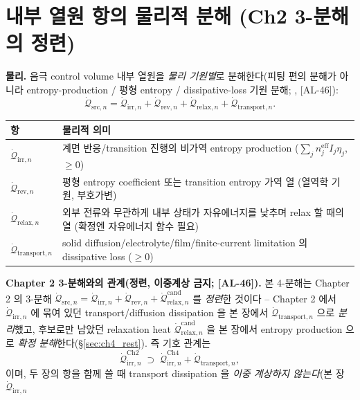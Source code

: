 \documentclass[11pt,a4paper]{article}
\newcommand{\eff}{\mathrm{eff}}
\newcommand{\irr}{\mathrm{irr}}
\newcommand{\rev}{\mathrm{rev}}
\newcommand{\src}{\mathrm{src}}
\newcommand{\rlx}{\mathrm{relax}}
\newcommand{\cand}{\mathrm{cand}}
\newcommand{\transp}{\mathrm{transport}}
\newcommand{\AL}[1]{\textsf{[AL-#1]}}
\begin{document}
\section{내부 열원 항의 물리적 분해 (Ch2 3-분해의 정련)}\label{sec:ch4_decomp}
\textbf{물리.} 음극 control volume 내부 열원을 \emph{물리 기원별}로 분해한다(피팅 편의 분해가 아니라
entropy-production / 평형 entropy / dissipative-loss 기원 분해; \cite{bernardi1985,rao1997,thomasnewman2003}, \AL{46}):
\begin{equation}
\dot{\mathcal Q}_{\src,n}=\dot{\mathcal Q}_{\irr,n}+\dot{\mathcal Q}_{\rev,n}+\dot{\mathcal Q}_{\rlx,n}+\dot{\mathcal Q}_{\transp,n}.
\label{eq:ch4_decomp}
\end{equation}
\begin{longtable}{p{} >{\raggedright\arraybackslash}p{}}
\toprule 항 & 물리적 의미 \\ \midrule \endhead
$\dot{\mathcal Q}_{\irr,n}$ & 계면 반응/transition 진행의 비가역 entropy production ($\sum_j n_j^{\eff}I_j\eta_j$, $\ge0$) \\
$\dot{\mathcal Q}_{\rev,n}$ & 평형 entropy coefficient 또는 transition entropy 가역 열 (열역학 기원, 부호가변) \\
$\dot{\mathcal Q}_{\rlx,n}$ & 외부 전류와 무관하게 내부 상태가 자유에너지를 낮추며 relax 할 때의 열 (확정엔 자유에너지 함수 필요) \\
$\dot{\mathcal Q}_{\transp,n}$ & solid diffusion/electrolyte/film/finite-current limitation 의 dissipative loss ($\ge0$) \\
\bottomrule
\end{longtable}
\textbf{Chapter 2 3-분해와의 관계(정련, 이중계상 금지; \AL{46}).} 본 4-분해는 Chapter 2 의 3-분해
$\dot{\mathcal Q}_{\src,n}=\dot{\mathcal Q}_{\irr,n}+\dot{\mathcal Q}_{\rev,n}+\dot{\mathcal Q}_{\rlx,n}^{\cand}$
를 \emph{정련}한 것이다 -- Chapter 2 에서 $\dot{\mathcal Q}_{\irr,n}$ 에 묶여 있던 transport/diffusion
dissipation 을 본 장에서 $\dot{\mathcal Q}_{\transp,n}$ 으로 \emph{분리}했고, 후보로만 남았던 relaxation heat
$\dot{\mathcal Q}_{\rlx,n}^{\cand}$ 을 본 장에서 entropy production 으로 \emph{확정 분해}한다(\S\ref{sec:ch4_rest}).
즉 기호 관계는
\begin{equation}
\dot{\mathcal Q}_{\irr,n}^{\mathrm{Ch2}}\;\supset\;\dot{\mathcal Q}_{\irr,n}^{\mathrm{Ch4}}+\dot{\mathcal Q}_{\transp,n},
\label{eq:ch4_ch2refine}
\end{equation}
이며, 두 장의 항을 함께 쓸 때 transport dissipation 을 \emph{이중 계상하지 않는다}(본 장 $\dot{\mathcal Q}_{\irr,n}$
\end{document}
